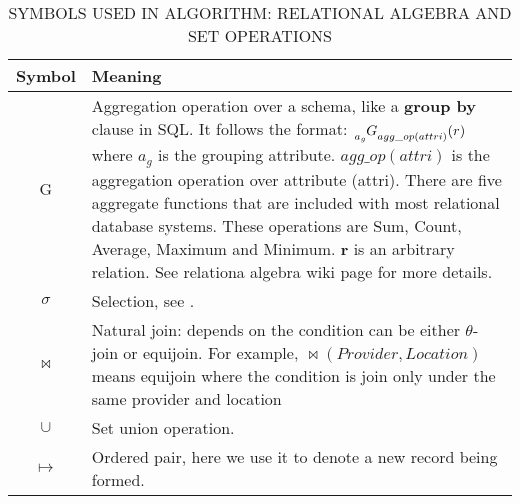 \documentclass[journal]{IEEEtran}
\begin{document}
\begin{table}[!h]
\begin{center}\caption{SYMBOLS USED IN ALGORITHM: RELATIONAL ALGEBRA AND SET OPERATIONS} \label{table:relational_algebra_set}
\begin{tabular}{|c|p{6cm}|}
\hline
\textbf{Symbol }& \textbf{Meaning } \\
\hline 
G & 
    Aggregation operation over a schema, like a \textbf{group by} clause in SQL.
    It follows the format:
    $\tensor[_{a_g}]{G}{_{agg\_op(attri)}} (r)$
    where $a_g$ is the grouping attribute.
    $agg\_op(attri)$ is the aggregation operation over attribute (attri). 
    There are five aggregate functions that are included with most relational database systems.
    These operations are Sum, Count, Average, Maximum and Minimum.
    \textbf{r} is an arbitrary relation.
    See relationa algebra wiki page \cite{ref36} for more details.\\
    
\hline $\sigma $ &  Selection, see \cite{ref36}.\\
\hline $\bowtie$ & Natural join: depends on the condition can be either $\theta$-join or equijoin. For example, $\bowtie(Provider,Location)$ means equijoin where the condition is join only under the same provider and location\\
\hline  $ \cup$  & Set union operation. \\
\hline $\mapsto $ & Ordered pair, here we use it to denote a new record being formed.\\
\hline
\end{tabular}
\end{center}
\end{table}
\end{document}
